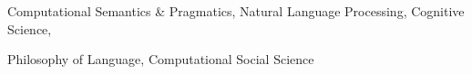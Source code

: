 Computational Semantics \& Pragmatics, Natural Language Processing, Cognitive Science,

Philosophy of Language, Computational Social Science
